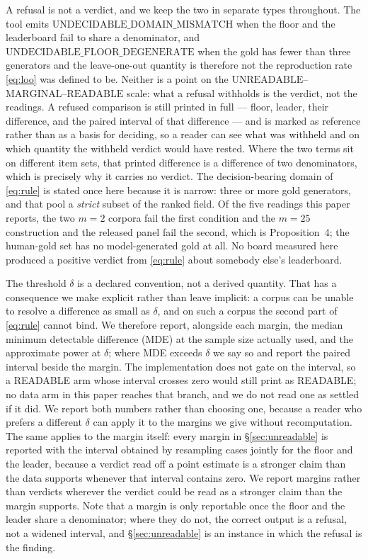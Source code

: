 \documentclass{article}
\begin{document}
A refusal is not a verdict, and we keep the two in separate types throughout. The tool emits $\mathrm{UNDECIDABLE\_DOMAIN\_MISMATCH}$ when the floor and the leaderboard fail to share a denominator, and $\mathrm{UNDECIDABLE\_FLOOR\_DEGENERATE}$ when the gold has fewer than three generators and the leave-one-out quantity is therefore not the reproduction rate \eqref{eq:loo} was defined to be. Neither is a point on the $\mathrm{UNREADABLE}$--$\mathrm{MARGINAL}$--$\mathrm{READABLE}$ scale: what a refusal withholds is the verdict, not the readings. A refused comparison is still printed in full --- floor, leader, their difference, and the paired interval of that difference --- and is marked as reference rather than as a basis for deciding, so a reader can see what was withheld and on which quantity the withheld verdict would have rested. Where the two terms sit on different item sets, that printed difference is a difference of two denominators, which is precisely why it carries no verdict. The decision-bearing domain of \eqref{eq:rule} is stated once here because it is narrow: three or more gold generators, and that pool a \emph{strict} subset of the ranked field. Of the five readings this paper reports, the two $m=2$ corpora fail the first condition and the $m=25$ construction and the released panel fail the second, which is Proposition~4; the human-gold set has no model-generated gold at all. No board measured here produced a positive verdict from \eqref{eq:rule} about somebody else's leaderboard.

The threshold $\delta$ is a declared convention, not a derived quantity. That has a consequence we make explicit rather than leave implicit: a corpus can be unable to resolve a difference as small as $\delta$, and on such a corpus the second part of \eqref{eq:rule} cannot bind. We therefore report, alongside each margin, the median minimum detectable difference (MDE) at the sample size actually used, and the approximate power at $\delta$; where MDE exceeds $\delta$ we say so and report the paired interval beside the margin. The implementation does not gate on the interval, so a READABLE arm whose interval crosses zero would still print as READABLE; no data arm in this paper reaches that branch, and we do not read one as settled if it did. We report both numbers rather than choosing one, because a reader who prefers a different $\delta$ can apply it to the margins we give without recomputation. The same applies to the margin itself: every margin in \S\ref{sec:unreadable} is reported with the interval obtained by resampling cases jointly for the floor and the leader, because a verdict read off a point estimate is a stronger claim than the data supports whenever that interval contains zero. We report margins rather than verdicts wherever the verdict could be read as a stronger claim than the margin supports. Note that a margin is only reportable once the floor and the leader share a denominator; where they do not, the correct output is a refusal, not a widened interval, and \S\ref{sec:unreadable} is an instance in which the refusal is the finding.
\end{document}
